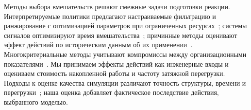 Методы выбора вмешательств решают смежные задачи подготовки реакции. Интерпретируемые политики предлагают настраиваемые фильтрацию и ранжирование с оптимизацией параметров при ограниченных ресурсах~\cite{whitebox}; системы сигналов оптимизируют время вмешательства~\cite{alarms}; причинные методы оценивают эффект действий по историческим данным об их применении~\cite{causal}. Многокритериальные методы учитывают компромиссы между организационными показателями~\cite{multikpi}. Мы принимаем эффекты действий как инженерные входы и оцениваем стоимость накопленной работы и частоту затяжной перегрузки. Подходы к оценке качества симуляции различают точность структуры, времени и перегрузки~\cite{validation}; наша оценка добавляет фактическое последствие действия, выбранного моделью.
